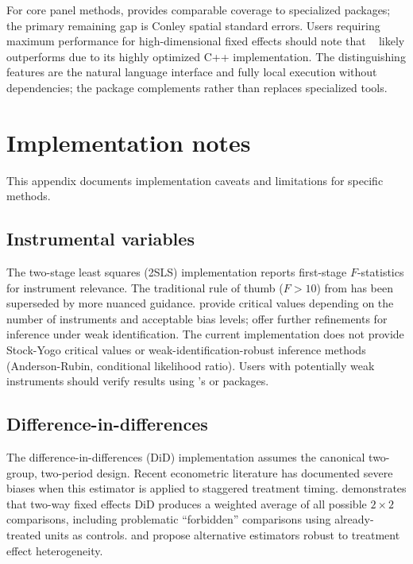 For core panel methods,  provides comparable
coverage to specialized  packages; the primary remaining
gap is Conley spatial standard errors. Users requiring maximum
performance for high-dimensional fixed effects should note that
~\citep{Berge:2018} likely outperforms
 due to its highly optimized C++
implementation. The distinguishing features are the natural language
interface and fully local execution without  dependencies;
the package complements rather than replaces specialized tools.

\section{Implementation notes} \label{app:implementation}
\setcounter{table}{0}
\setcounter{figure}{0}

This appendix documents implementation caveats and limitations for specific
methods.

\subsection{Instrumental variables}

The two-stage least squares (2SLS) implementation reports first-stage
$F$-statistics for instrument relevance. The traditional rule of thumb ($F > 10$) from \citet{Staiger+Stock:1997}
has been superseded by more nuanced guidance. \citet{Stock+Yogo:2005} provide
critical values depending on the number of instruments and acceptable bias
levels; \citet{Lee+etal:2022} offer further refinements for inference under
weak identification. The current implementation does not provide Stock-Yogo
critical values or weak-identification-robust inference methods (Anderson-Rubin,
conditional likelihood ratio). Users with potentially weak instruments should
verify results using 's  or  packages.

\subsection{Difference-in-differences}

The difference-in-differences (DiD) implementation assumes the canonical
two-group, two-period design.
Recent econometric literature has documented severe biases when this estimator
is applied to staggered treatment timing. \citet{Goodman-Bacon:2021} demonstrates
that two-way fixed effects DiD produces a weighted average of all possible $2 \times 2$
comparisons, including problematic ``forbidden'' comparisons using already-treated
units as controls. \citet{deChaisemartin+DHaultfoeuille:2020} and
\citet{Sun+Abraham:2021} propose alternative estimators robust to treatment
effect heterogeneity.

